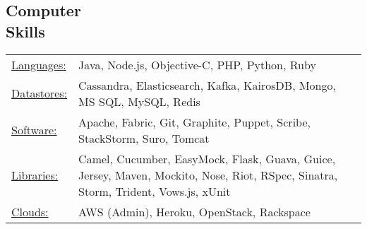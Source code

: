 \documentclass[margin]{res}
\begin{document}
\begin{resume}


\section{Computer \\ Skills}
   \begin{tabular}{l p{3in}}
    \underline{Languages:} & %
    Java, Node.js, Objective-C, PHP, Python, Ruby \\
    \underline{Datastores:} & Cassandra, Elasticsearch, Kafka, KairosDB, Mongo, MS SQL, MySQL, 
    Redis \\
     \underline{Software:} & Apache,
Fabric, 
Git, %
Graphite, 
     Puppet, 
     Scribe,
     StackStorm,
     Suro,
     Tomcat \\
     \underline{Libraries:} & Camel, Cucumber,
     EasyMock, 
     Flask, Guava, Guice,
     Jersey, Maven, Mockito, Nose,
     Riot, RSpec, 
       Sinatra, Storm, Trident, Vows.js, xUnit \\
\underline{Clouds:} & AWS (Admin), 
Heroku, OpenStack, Rackspace \\
\end{tabular}


\end{resume}
\end{document}
